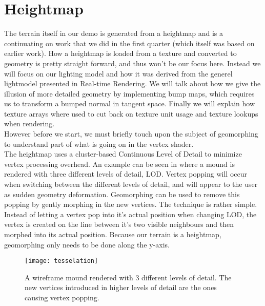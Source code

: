 \chapter{Heightmap}


The terrain itself in our demo is generated from a heightmap and is a
continuating on work that we did in the first quarter (which itself
was based on earlier work). How a heightmap is loaded from a texture
and converted to geometry is pretty straight forward, and thus won't
be our focus here. Instead we will focus on our lighting model and how
it was derived from the generel lightmodel presented in Real-time
Rendering. We will talk about how we give the illusion of more
detailed geometry by implementing bump maps, which requires us to
transform a bumped normal in tangent space. Finally we will explain
how texture arrays where used to cut back on texture unit usage and
texture lookups when rendering.\\


However before we start, we must briefly touch upon the subject of
geomorphing to understand part of what is going on in the vertex
shader.\\


The heightmap uses a cluster-based Continuous Level of Detail to
minimize vertex processing overhead. An example can be seen in
 where a mound is rendered with three
different levels of detail, LOD. Vertex popping will occur when
switching between the different levels of detail, and will appear to
the user as sudden geometry deformation. Geomorphing can be used to
remove this popping by gently morphing in the new vertices. The
technique is rather simple. Instead of letting a vertex pop into it's
actual position when changing LOD, the vertex is created on the line
between it's two visible neighbours and then morphed into its actual
position. Because our terrain is a heightmap, geomorphing only needs
to be done along the y-axis.

\begin{figure}
  \label{fig:tesselation}
  \centering
  \texttt{[image: tesselation]}
  \caption{A wireframe mound rendered with 3 different levels of
    detail. The new vertices introduced in higher levels of detail are
    the ones causing vertex popping.}
\end{figure}

